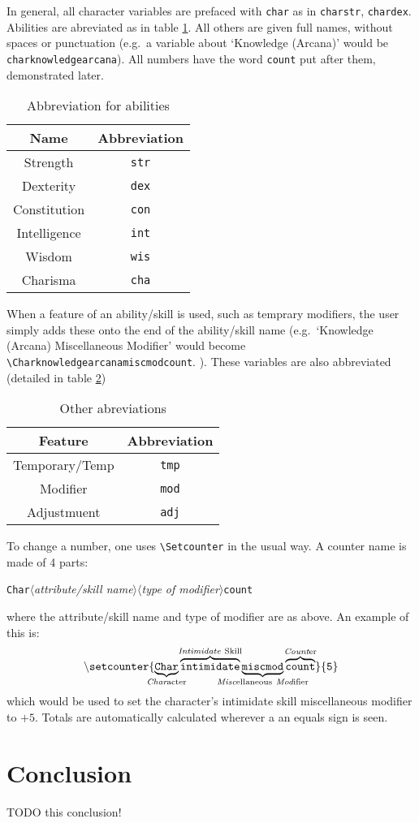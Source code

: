\documentclass[oneside]{article}
\begin{document}
In general, all character variables are prefaced with \verb=char= as in \verb=charstr=, \verb=chardex=. Abilities are abreviated as in table \ref{tab:abbrev}. All others are given full names, without spaces or punctuation (e.g.\ a variable about `Knowledge (Arcana)' would be \verb=charknowledgearcana=). All numbers have the word \verb=count= put after them, demonstrated later.

\begin{table}[h]
  \centering
  \begin{tabular}{c c }
    Name & Abbreviation\\\hline
    Strength & \verb=str=\\
    Dexterity & \verb=dex=\\
    Constitution & \verb=con=\\
    Intelligence & \verb=int=\\
    Wisdom & \verb=wis=\\
    Charisma & \verb=cha=\\\hline
  \end{tabular}
  \caption{Abbreviation for abilities}
  \label{tab:abbrev}
\end{table}

When a feature of an ability/skill is used, such as temprary modifiers, the user simply adds these onto the end of the ability/skill name (e.g.\ `Knowledge (Arcana) Miscellaneous Modifier' would become \verb=\Charknowledgearcanamiscmodcount=. ). These variables are also abbreviated (detailed in table \ref{tab:otherabbrev})

\begin{table}[h]
  \centering
  \begin{tabular}{c c }
    Feature & Abbreviation \\\hline
    Temporary/Temp & \verb=tmp=\\
    Modifier & \verb=mod=\\
    Adjustmuent & \verb=adj=\\\hline
  \end{tabular}
  \caption{Other abreviations}
  \label{tab:otherabbrev}
\end{table}

To change a number, one uses \verb=\Setcounter= in the usual way. A counter name is made of 4 parts:
\protect\parbox{\linewidth}{\texttt{Char}$\langle$\emph{attribute/skill name}$\rangle\langle$\emph{type of modifier}$\rangle$\texttt{count}}
where the attribute/skill name and type of modifier are as above. An example of this is:
\[
\mathtt{\backslash setcounter\{\underbrace{\mathtt{Char}}_{\mathclap{\mathrm{\emph{Char}acter}}}\overbrace{\mathtt{intimidate}}^{\mathclap{\mathrm{\emph{Intimidate}\ Skill}}}\underbrace{\mathtt{miscmod}}_{\mathclap{\mathrm{\emph{Misc}ellaneous\ \emph{Mod}ifier}}}\overbrace{\mathtt{count}}^{\mathclap{\mathrm{\emph{Count}er}}}\}\{5\}}
\]
which would be used to set the character's intimidate skill miscellaneous modifier to $+5$. Totals are automatically calculated wherever a an equals sign is seen.

\section{Conclusion}
\label{sec:conclusion}

TODO this conclusion!
\end{document}
